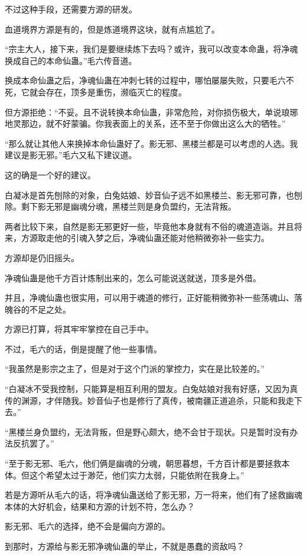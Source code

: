 \begin{this_body}
不过这种手段，还需要方源的研发。

血道境界方源是有的，但是炼道境界这块，就有点尴尬了。

“宗主大人，接下来，我们是要继续炼下去吗？或许，我可以改变本命蛊，将净魂换成自己的本命仙蛊。”毛六传音道。

换成本命仙蛊之后，净魂仙蛊在冲刺七转的过程中，哪怕屡屡失败，只要毛六不死，它就会存在，顶多是重伤，濒临灭亡的程度。

但方源拒绝：“不妥。且不说转换本命仙蛊，非常危险，对你损伤极大，单说琅琊地灵那边，就不好蒙骗。你我表面上的关系，还不至于你做出这么大的牺牲。”

“那么就让其他人来换掉本命仙蛊好了。影无邪、黑楼兰都是可以考虑的人选。我建议是影无邪。”毛六又私下建议道。

这的确是一个好的建议。

白凝冰是首先刨除的对象，白兔姑娘、妙音仙子远不如黑楼兰、影无邪可靠，也刨除。剩下影无邪是幽魂分魂，黑楼兰则是身负盟约，无法背叛。

两者比较下来，自然是影无邪更好一些，毕竟他本身就有不俗的魂道造诣。并且将来，方源取走他的引魂入梦之后，净魂仙蛊还能对他稍微弥补一些实力。

方源却是仍旧摇头。

净魂仙蛊是他千方百计炼制出来的，怎么可能说送就送，顶多是外借。

并且，净魂仙蛊也很实用，可以用于魂道的修行，正好能稍微弥补一些荡魂山、落魄谷的不足之处。

方源已打算，将其牢牢掌控在自己手中。

不过，毛六的话，倒是提醒了他一些事情。

“我虽然是影宗之主了，但是对于这个门派的掌控力，实在是比较差的。”

“白凝冰不受我控制，只能算是相互利用的盟友。白兔姑娘对我有好感，又因为真传的渊源，才伴随我。妙音仙子也是修行了真传，被南疆正道追杀，只能和我走下去。”

“黑楼兰身负盟约，无法背叛，但是野心颇大，绝不会甘于现状。只是暂时没有办法反抗罢了。”

“至于影无邪、毛六，他们俩是幽魂的分魂，朝思暮想，千方百计都是要拯救本体。但这个希望太过于渺茫，他们实力太弱，只能依附在我身上。”

若是方源听从毛六的话，将净魂仙蛊送给了影无邪，万一将来，他们有了拯救幽魂本体的大好机会，结果和方源的计划不符，怎么办？

影无邪、毛六的选择，绝不会是偏向方源的。

到那时，方源给与影无邪净魂仙蛊的举止，不就是愚蠢的资敌吗？


\end{this_body}

